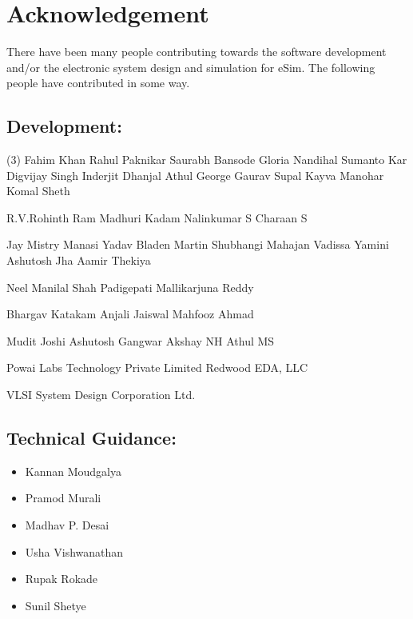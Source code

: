 \section*{Acknowledgement}

There  have  been  many  people contributing towards the software development and/or the electronic system design and simulation for eSim. The following people have contributed in some way.

\subsection*{Development:}
\begin{tasks}[style=itemize](3)
    \task Fahim Khan
    \task Rahul Paknikar
    \task Saurabh Bansode
    \task Gloria Nandihal
    \task Sumanto Kar
    \task Digvijay Singh
    \task Inderjit Dhanjal
    \task Athul George
    \task Gaurav Supal
    \task Kayva Manohar
    \task Komal Sheth


    \task R.V.Rohinth Ram
    \task Madhuri Kadam
    \task Nalinkumar S
    \task Charaan S


    \task Jay Mistry
    \task Manasi Yadav
    \task Bladen Martin
    \task Shubhangi Mahajan
    \task Vadissa Yamini
    \task Ashutosh Jha
    \task Aamir Thekiya

    \task Neel Manilal Shah
    \task Padigepati Mallikarjuna Reddy
    
    \vspace{-1mm}
    
    \task Bhargav Katakam
    \task Anjali Jaiswal
    \task Mahfooz Ahmad

    \task Mudit Joshi
    \task Ashutosh Gangwar
    \task Akshay NH
    \task Athul MS

    
    \task Powai Labs Technology Private Limited
    \task Redwood EDA, LLC
    
    \vspace{-1mm}
    
    \task* VLSI System Design Corporation Ltd.
\end{tasks}


\subsection*{Technical Guidance:}
\begin{multicols}{3}
\begin{itemize}
    \item Kannan Moudgalya
    \item Pramod Murali
    \item Madhav P. Desai
    \item Usha Vishwanathan
    \item Rupak Rokade
    \item Sunil Shetye
\end{itemize}
\end{multicols}

